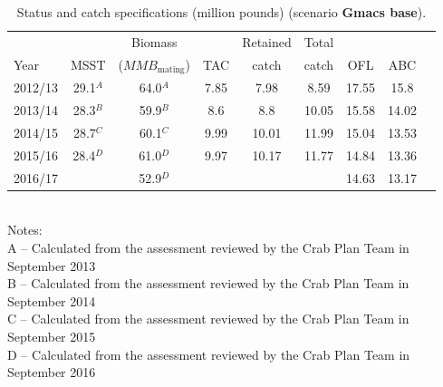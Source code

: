 \documentclass[]{article}
\begin{document}
\begin{table}[ht]
\centering
\caption{Status and catch specifications (million pounds) (scenario {\bf Gmacs base}).} 
\label{tab:status_pounds}
\begin{tabular}{lcccccccc}
\hline
          &          & Biomass                        &     & Retained & Total &     &     \\ 
Year      & MSST     & ($\mathit{MMB}_\text{mating}$) & TAC & catch    & catch & OFL & ABC \\ 
\hline
2012/13 & 29.1$^A$ & 64.0$^A$         & 7.85 & 7.98           & 8.59        & 17.55 & 15.8  \\
2013/14 & 28.3$^B$ & 59.9$^B$         & 8.6  & 8.8            & 10.05       & 15.58 & 14.02 \\
2014/15 & 28.7$^C$ & 60.1$^C$         & 9.99 & 10.01          & 11.99       & 15.04 & 13.53 \\
2015/16 & 28.4$^D$ & 61.0$^D$         & 9.97 & 10.17          & 11.77       & 14.84 & 13.36 \\
2016/17 &          & 52.9$^D$         &      &                &             & 14.63 & 13.17 \\
\hline
\end{tabular} \\
     
Notes: \\
A – Calculated from the assessment reviewed by the Crab Plan Team in September 2013 \\
B – Calculated from the assessment reviewed by the Crab Plan Team in September 2014 \\
C – Calculated from the assessment reviewed by the Crab Plan Team in September 2015\\
D – Calculated from the assessment reviewed by the Crab Plan Team in September 2016\\
\end{table}
\end{document}
